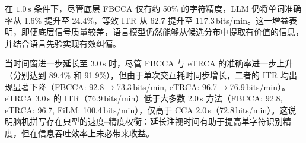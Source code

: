 在 $1.0\,\mathrm{s}$ 条件下，尽管底层 FBCCA 仅有约 50\% 的字符精度，LLM 仍将单词准确率从 1.6\% 提升至 24.4\%，等效 ITR 从 62.7 提升至 117.3\,bits/min。这一增益表明，即便底层信号质量较差，语言模型仍然能够从候选分布中提取有价值的信息，并结合语言先验实现有效纠偏。



当时间窗进一步延长至 $3.0\,\mathrm{s}$ 时，尽管 FBCCA 与 eTRCA 的准确率进一步上升（分别达到 89.4\% 和 91.9\%），但由于单次交互耗时同步增长，二者的 ITR 均出现显著下降（FBCCA: 92.8$\rightarrow$73.3\,bits/min, eTRCA: 96.7$\rightarrow$76.9\,bits/min）。eTRCA 3.0\,s 的 ITR（76.9\,bits/min）低于大多数 2.0\,s 方法（FBCCA: 92.8, eTRCA: 96.7, FiLM: 100.4\,bits/min），仅高于 CCA 2.0\,s（72.8\,bits/min）。这说明脑机拼写存在典型的速度--精度权衡：延长注视时间有助于提高单字符识别精度，但在信息吞吐效率上未必带来收益。


